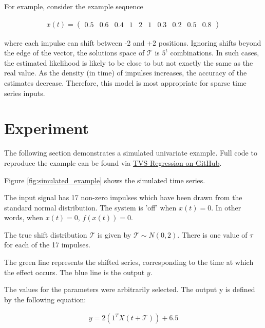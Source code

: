 \documentclass[11pt]{amsart}
\begin{document}
For example, consider the example sequence 

\begin{align}
    x(t) = 
    \left(
\begin{array}{cccccccccc}
    0.5 & 0.6 & 0.4 & 1 & 2 & 1 &
    0.3 & 0.2 & 0.5 & 0.8 
\end{array}  
\right)
\end{align}

where each impulse can shift between -2 and +2 positions. Ignoring shifts beyond the edge of the vector, the solutions space of $\mathcal{T}$ is $5^t$ combinations.  
In such cases, the estimated likelihood is likely to be close to but not exactly the same as the real value. As the density (in time) of impulses increases, the accuracy of the estimates decrease. Therefore, this model is most appropriate for sparse time series inputs.

\section{Experiment}

The following section demonstrates a simulated univariate example. Full code to reproduce the example can be found via \href{https://github.com/aaron1rcl/tvs_regression/}{TVS Regression on GitHub}.

Figure \ref{fig:simulated_example} shows the simulated time series.

The input signal has 17 non-zero impulses which have been drawn from the standard normal distribution. The system is 'off' when $x(t) =0$. In other words, when $x(t) = 0$, $f(x(t)) = 0$. 

The true shift distribution $\mathcal{T}$ is given by $\mathcal{T} \sim N(0, 2)$. There is one value of $\tau$ for each of the 17 impulses.

The green line represents the shifted series, corresponding to the time at which the effect occurs. The blue line is the output $y$.

The values for the parameters were arbitrarily selected. The output y is defined by the following equation:


\begin{align}
    y = 2(1^TX(t + \mathcal{T})) + 6.5
\end{align}
\end{document}

